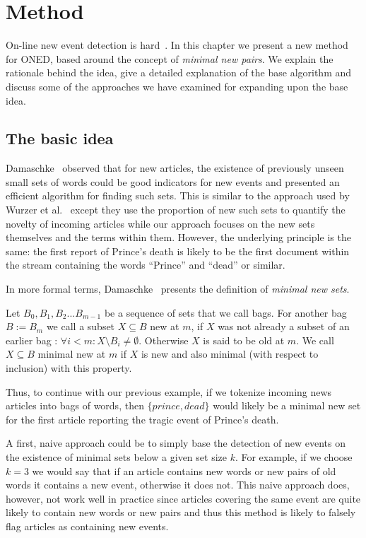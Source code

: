 \chapter{Method}
\label{chapter:method}
On-line new event detection is hard~\cite{allan2000hard}. In this chapter we present a new method for ONED, based around the concept of \emph{minimal new pairs}. We explain the rationale behind the idea, give a detailed explanation of the base algorithm and discuss some of the approaches we have examined for expanding upon the base idea.


\section{The basic idea}
\label{section:idea}
Damaschke~\cite{damaschke2015pairs} observed that for new articles, the existence of previously unseen small sets of words could be good indicators for new events and presented an efficient algorithm for finding such sets. This is similar to the approach used by Wurzer et al.~\cite{wurzer2015kterm} except they use the proportion of new such sets to quantify the novelty of incoming articles while our approach focuses on the new sets themselves and the terms within them. However, the underlying principle is the same: the first report of Prince's death is likely to be the first document within the stream containing the words ``Prince'' and ``dead'' or similar. 

In more formal terms, Damaschke~\cite{damaschke2015pairs} presents the definition of \emph{minimal new sets}. 

\begin{definition}
  Let $B_0, B_1, B_2...B_{m-1}$ be a sequence of sets that we call bags. For another bag $B:=B_{m}$ we call a subset $X \subseteq B$ new at $m$, if $X$ was not already a subset of an earlier bag : $\forall i < m : X \setminus B_{i} \neq \emptyset$. Otherwise $X$ is said to be old at $m$. We call $X \subseteq B$ minimal new at $m$ if $X$ is new and also minimal (with respect to inclusion) with this property.
\end{definition}

Thus, to continue with our previous example, if we tokenize incoming news articles into bags of words, then $\{prince, dead\}$ would likely be a minimal new set for the first article reporting the tragic event of Prince's death.

A first, naive approach could be to simply base the detection of new events on the existence of minimal sets below a given set size $k$. For example, if we choose $k=3$ we would say that if an article contains new words or new pairs of old words it contains a new event, otherwise it does not. This naive approach does, however, not work well in practice since articles covering the same event are quite likely to contain new words or new pairs and thus this method is likely to falsely flag articles as containing new events.

